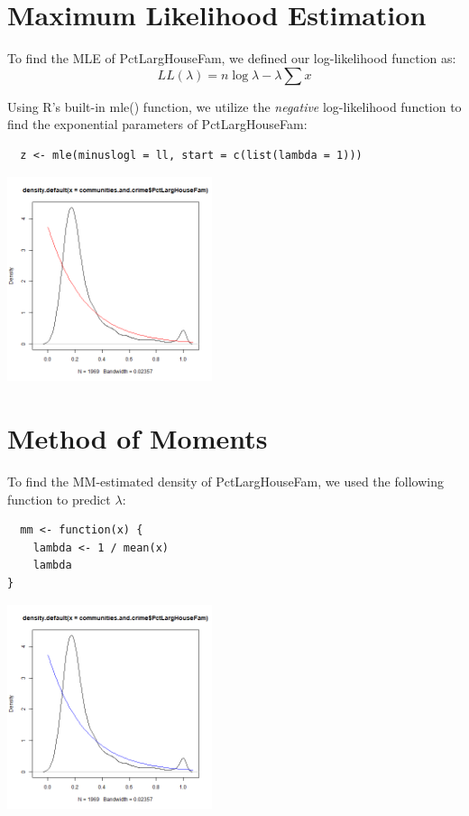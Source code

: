 \documentclass[12pt, letterpaper]{report}
\begin{document}
\pagebreak
\section{Maximum Likelihood Estimation}
To find the MLE of PctLargHouseFam, we defined our log-likelihood function as:
\begin{equation}
 LL(\lambda) = n \log{\lambda} - \lambda \sum{x}
\end{equation}

Using R's built-in mle() function, we utilize the \textit{negative} log-likelihood function to find the exponential parameters of PctLargHouseFam:
\begin{lstlisting}
  z <- mle(minuslogl = ll, start = c(list(lambda = 1)))
\end{lstlisting} 

\begin{center}
\includegraphics[width=0.45\textwidth]{exponential/PctLargHouseFam_mle}
\end{center}

\pagebreak
\section{Method of Moments}
To find the MM-estimated density of PctLargHouseFam, we used the following function to predict $\lambda$:
\begin{lstlisting}
  mm <- function(x) {
    lambda <- 1 / mean(x)
    lambda
}
\end{lstlisting}

\begin{center}
\includegraphics[width=0.45\textwidth]{exponential/PctLargHouseFam_mm}
\end{center}
\end{document}
